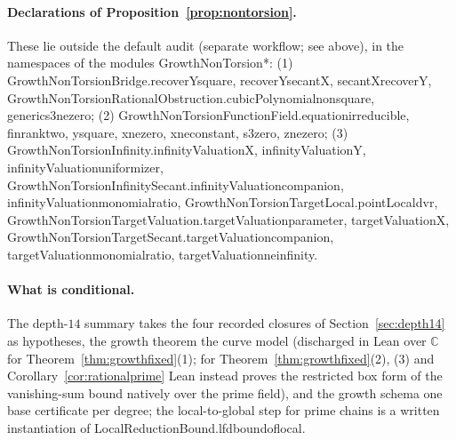 \documentclass[11pt]{article}
\theoremstyle{definition}\newtheorem{definition}[theorem]{Definition}
\theoremstyle{remark}\newtheorem{remark}[theorem]{Remark}
\newcommand{\codeus}{\textunderscore\allowbreak}
\newcommand{\code}[1]{{\ttfamily\let\_\codeus#1}}
\begin{document}
\begin{sloppypar}
\paragraph{Declarations of Proposition~\ref{prop:nontorsion}.} These lie outside the default audit (separate workflow; see above), in the namespaces of the modules \code{GrowthNonTorsion*}: (1) \code{GrowthNonTorsionBridge.\allowbreak{}recoverY\_square}, \code{recoverY\_secantX}, \code{secantX\_recoverY}, \code{GrowthNonTorsionRationalObstruction.\allowbreak{}cubicPolynomial\_nonsquare}, \code{generic\_s3\_ne\_zero}; (2) \code{GrowthNonTorsionFunctionField.\allowbreak{}equation\_irreducible}, \code{finrank\_two}, \code{y\_square}, \code{x\_ne\_zero}, \code{x\_ne\_constant}, \code{s3\_zero}, \code{z\_ne\_zero}; (3) \code{GrowthNonTorsionInfinity.\allowbreak{}infinityValuation\_X}, \code{infinityValuation\_Y}, \code{infinityValuation\_uniformizer}, \code{GrowthNonTorsionInfinitySecant.\allowbreak{}infinityValuation\_companion}, \code{infinityValuation\_monomial\_ratio}, \code{GrowthNonTorsionTargetLocal.\allowbreak{}pointLocal\_dvr}, \code{GrowthNonTorsionTargetValuation.\allowbreak{}targetValuation\_parameter}, \code{targetValuation\_X}, \code{GrowthNonTorsionTargetSecant.\allowbreak{}targetValuation\_companion}, \code{targetValuation\_monomial\_ratio}, \code{targetValuation\_ne\_infinity}.
\end{sloppypar}

\paragraph{What is conditional.} The depth-$14$ summary takes the four
recorded closures of Section~\ref{sec:depth14} as hypotheses, the growth
theorem the curve model (discharged in Lean over $\mathbb{C}$ for
Theorem~\ref{thm:growthfixed}(1); for Theorem~\ref{thm:growthfixed}(2), (3)
and Corollary~\ref{cor:rationalprime} Lean instead proves the restricted
box form of the vanishing-sum bound natively over the prime field), and the growth schema one base certificate per
degree; the local-to-global step for prime chains is a written
instantiation of \code{LocalReductionBound.lfd\_bound\_of\_local}.
\end{document}
